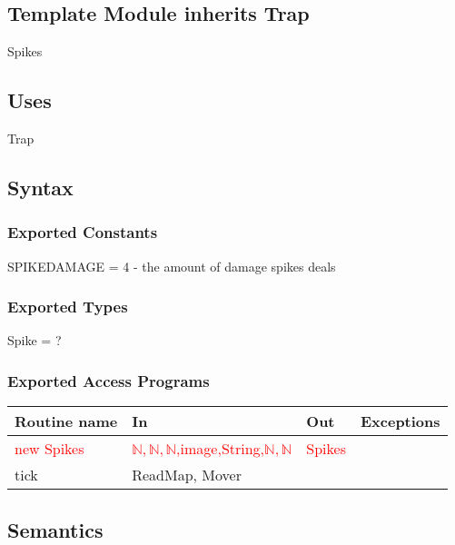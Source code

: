 \documentclass[12pt]{article}
\begin{document}
\subsection*{Template Module inherits Trap}%

Spikes

\subsection*{Uses}

Trap

\subsection*{Syntax}

\subsubsection*{Exported Constants}

SPIKEDAMAGE = 4 - the amount of damage spikes deals

\subsubsection*{Exported Types}

Spike = ?

\subsubsection*{Exported Access Programs}

\begin{tabular}{| l | l | l | l |}
\hline
\textbf{Routine name} & \textbf{In} & \textbf{Out} & \textbf{Exceptions}\\
\hline
\textcolor{red}{new Spikes} & \textcolor{red}{$\mathbb{N}, \mathbb{N}, \mathbb{N}$,image,String,$\mathbb{N},\mathbb{N}$} & \textcolor{red}{Spikes} & \\
\hline
tick & ReadMap, Mover & ~ & ~\\
\hline
\end{tabular}

\subsection*{Semantics}
\end{document}
